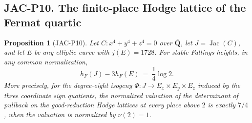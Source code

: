\documentclass[11pt,a4paper]{article}
\newtheorem{proposition}[theorem]{Proposition}
\begin{document}
\subsection*{JAC-P10. The finite-place Hodge lattice of the Fermat quartic}

\begin{proposition}[JAC-P10]
\label{jac:P10}
Let $C:x^4+y^4+z^4=0$ over $\overline{\mathbf Q}$, let
$J=\operatorname{Jac}(C)$, and let $E$ be any elliptic curve with
$j(E)=1728$. For stable Faltings heights, in any common normalization,
\[
 h_F(J)-3h_F(E)\ =\ \frac14\log 2.                 \tag{JAC.P10.1}
\]
More precisely, for the degree-eight isogeny
$\Phi:J\to E_x\times E_y\times E_z$ induced by the three coordinate
sign quotients, the normalized valuation of the determinant of
pullback on the good-reduction Hodge lattices at every place above
$2$ is exactly $7/4$, when the valuation is normalized by $\nu(2)=1$.
\end{proposition}
\end{document}

